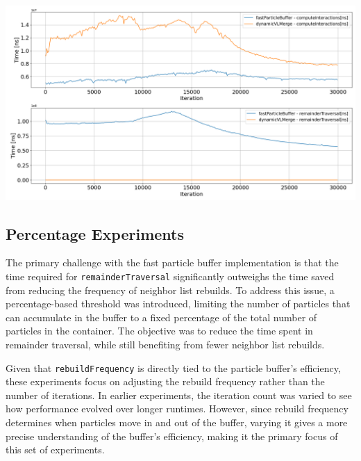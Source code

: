 \begin{center}
\includegraphics[width=\linewidth]{graphs/constantVelocityCube/normalExperiments/iter/vlpc08dvlpb.png}
\label{fig:fpbvsdvl_vlpc08}
\end{center}






\subsection{Percentage Experiments}

The primary challenge with the fast particle buffer implementation is that the time required for \texttt{remainderTraversal} significantly outweighs the time saved from reducing the frequency of neighbor list rebuilds. To address this issue, a percentage-based threshold was introduced, limiting the number of particles that can accumulate in the buffer to a fixed percentage of the total number of particles in the container. The objective was to reduce the time spent in remainder traversal, while still benefiting from fewer neighbor list rebuilds.

Given that \texttt{rebuildFrequency} is directly tied to the particle buffer's efficiency, these experiments focus on adjusting the rebuild frequency rather than the number of iterations. In earlier experiments, the iteration count was varied to see how performance evolved over longer runtimes. However, since rebuild frequency determines when particles move in and out of the buffer, varying it gives a more precise understanding of the buffer's efficiency, making it the primary focus of this set of experiments.


